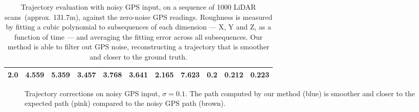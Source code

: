 \begin{table}[h!]
{\begin{tabular}{c|ccccc|ccccc}
            2.0                     & 4.559                                         & 5.359                                       & 3.457                                & 3.768                                      & 3.641          & 2.165          & 7.623          & 0.2            & 0.212          & 0.223          \\
            \hline
        \end{tabular}
    }
    \caption[Trajectory evaluation with noisy GPS]{Trajectory evaluation with noisy GPS input, on a sequence of 1000 LiDAR scans~(approx. 131.7m), against the zero-noise GPS readings. Roughness is measured by fitting a cubic polynomial to subsequences of each dimension --- X, Y and Z, as a function of time --- and averaging the fitting error across all subsequences. Our method is able to filter out GPS noise, reconstructing a trajectory that is smoother and closer to the ground truth.}
    \label{tab:gps-noisy}
\end{table}
\begin{figure}[h]
    \centering
    \caption[Trajectory corrections over noisy GPS]{Trajectory corrections on noisy GPS input, $\sigma = 0.1$. The path computed by our method (blue) is smoother and closer to the expected path (pink) compared to the noisy GPS path (brown).}
    \label{fig:gps-noise-correction}
\end{figure}


